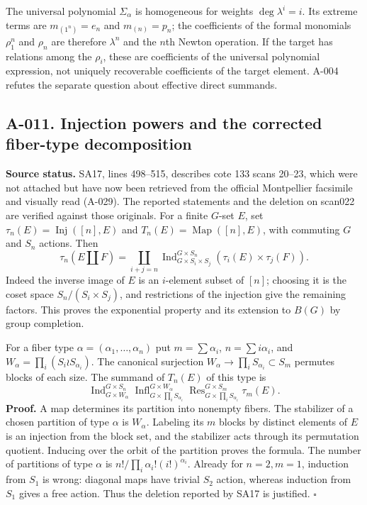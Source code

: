 \documentclass[11pt]{article}
\begin{document}
The universal polynomial $\Sigma_\alpha$ is homogeneous for weights
$\deg\lambda^i=i$. Its extreme terms are $m_{(1^n)}=e_n$ and
$m_{(n)}=p_n$; the coefficients of the formal monomials $\rho_1^n$
and $\rho_n$ are therefore $\lambda^n$ and the $n$th Newton operation.
If the target has relations among the $\rho_i$, these are coefficients
of the universal polynomial expression, not uniquely recoverable
coefficients of the target element. A-004 refutes the separate question
about effective direct summands.

\subsection*{A-011. Injection powers and the corrected fiber-type decomposition}
\textbf{Source status.} SA17, lines 498--515, describes cote 133 scans
20--23, which were not attached but have now been retrieved from the
official Montpellier facsimile and visually read (A-029). The
reported statements and the deletion on scan022 are verified against
those originals. For a finite $G$-set $E$, set
$\tau_n(E)=\operatorname{Inj}([n],E)$ and
$T_n(E)=\operatorname{Map}([n],E)$, with commuting $G$ and $S_n$ actions.
Then
\[
 \tau_n(E\amalg F)=\coprod_{i+j=n}
 \operatorname{Ind}_{G\times S_i\times S_j}^{G\times S_n}
       (\tau_i(E)\times\tau_j(F)).
\]
Indeed the inverse image of $E$ is an $i$-element subset of $[n]$;
choosing it is the coset space $S_n/(S_i\times S_j)$, and restrictions
of the injection give the remaining factors. This proves the
exponential property and its extension to $B(G)$ by group completion.

For a fiber type $\alpha=(\alpha_1,\ldots,\alpha_n)$ put
$m=\sum\alpha_i$, $n=\sum i\alpha_i$, and
$W_\alpha=\prod_i(S_i\wr S_{\alpha_i})$. The canonical surjection
$W_\alpha\to\prod_iS_{\alpha_i}\subset S_m$ permutes blocks of
each size. The summand of $T_n(E)$ of this type is
\[
 \operatorname{Ind}_{G\times W_\alpha}^{G\times S_n}
 \operatorname{Infl}_{G\times\prod_iS_{\alpha_i}}^{G\times W_\alpha}
 \operatorname{Res}_{G\times\prod_iS_{\alpha_i}}^{G\times S_m}
 \tau_m(E).
\]
\textbf{Proof.} A map determines its partition into nonempty fibers.
The stabilizer of a chosen partition of type $\alpha$ is $W_\alpha$.
Labeling its $m$ blocks by distinct elements of $E$ is an injection
from the block set, and the stabilizer acts through its permutation
quotient. Inducing over the orbit of the partition proves the formula.
The number of partitions of type $\alpha$ is
$n!/\prod_i\alpha_i!(i!)^{\alpha_i}$. Already for $n=2,m=1$,
induction from $S_1$ is wrong: diagonal maps have trivial $S_2$ action,
whereas induction from $S_1$ gives a free action. Thus the deletion
reported by SA17 is justified. \hfill$\square$
\end{document}
